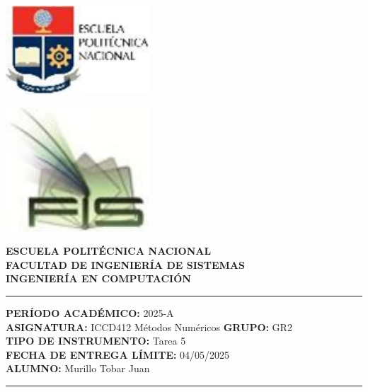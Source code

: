 \documentclass[12pt]{article}
\begin{document}
\begin{minipage}{0.45\textwidth}
    \includegraphics[width=0.4\textwidth]{inFiles/Figures/epnLogo.jpg}
\end{minipage}
\hfill
\begin{minipage}{0.45\textwidth}
    \raggedleft
    \includegraphics[width=0.4\textwidth]{inFiles/Figures/FIS_logo.jpg}
\end{minipage}

\vspace{0.5cm}

\begin{center}
    \textbf{ESCUELA POLITÉCNICA NACIONAL}\\[0.2cm]
    \textbf{FACULTAD DE INGENIERÍA DE SISTEMAS}\\[0.2cm]
    \textbf{INGENIERÍA {\textbf{EN COMPUTACIÓN}}}
\end{center}

\vspace{0.5cm}
\hrule
\vspace{0.5cm}

\noindent\textbf{PERÍODO ACADÉMICO:} 2025-A\\[0.2cm]
\noindent\textbf{ASIGNATURA:} ICCD412 Métodos Numéricos \hfill \textbf{GRUPO:} GR2\\[0.2cm]
\noindent\textbf{TIPO DE INSTRUMENTO:} Tarea 5\\[0.2cm]
\noindent\textbf{FECHA DE ENTREGA LÍMITE:} 04/05/2025\\[0.2cm]
\noindent\textbf{ALUMNO:} Murillo Tobar Juan

\vspace{0.5cm}
\hrule
\vspace{1cm}
\end{document}
